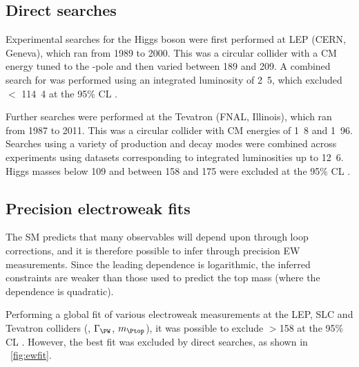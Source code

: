 \subsection{Direct searches}
\label{sec:prior_constraints:direct}

Experimental searches for the Higgs boson were first performed at LEP (CERN, Geneva), which ran from 1989 to 2000. This was a circular \epluseminus collider with a \ac{CM} 
energy tuned to the \PZ-pole and then varied between 189 and \unit{209}{\GeV}. A combined 
search for \ZH was performed using an integrated luminosity of \unit{2.5}{\invfb}, which 
excluded \mH $<$ \unit{114.4}{\GeV} at the 95\% \ac{CL} \cite{LEP:2003}.

Further searches were performed at the Tevatron (FNAL, Illinois), which ran from 1987
to 2011. This was a circular \ppbar collider with \ac{CM} energies of \unit{1.8}{\TeV}
and \unit{1.96}{\TeV}. Searches using a variety of production and decay modes were
combined across experiments using datasets corresponding to integrated luminosities up to
\unit{12.6}{\invfb}. Higgs masses below \unit{109}{\GeV} and between 158 and 
\unit{175}{\GeV} were excluded at the 95\% \ac{CL} \cite{Tevatron:2010}.




\subsection{Precision electroweak fits}
\label{sec:prior_constraints:ew_fits}

The \ac{SM} predicts that many observables will depend upon \mH through loop corrections,
and it is therefore possible to infer \mH through precision \ac{EW} measurements. Since 
the leading \mH dependence is logarithmic, the inferred constraints are weaker than those
used to predict the top mass (where the dependence is quadratic).

Performing a global fit of various electroweak measurements at the \ac{LEP}, SLC and
Tevatron colliders (\eg \mW, $\Gamma_{\PW}$, $m_{\Ptop}$), it was possible to exclude 
\mH$>$\unit{158}{\GeV} at the 95\% \ac{CL} \cite{Gfitter:2008}. However, the best fit \mH
was excluded by direct searches, as shown in \Figure~\ref{fig:ewfit}.

